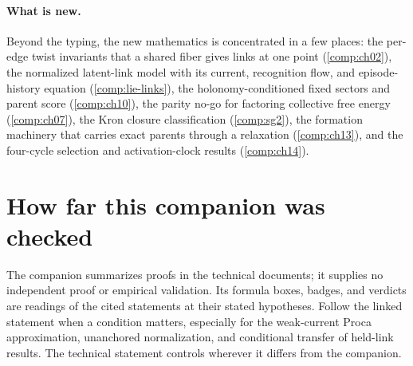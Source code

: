 \paragraph{What is new.}
Beyond the typing, the new mathematics is concentrated in a few places: the per-edge twist invariants
that a shared fiber gives links at one point (\cref{comp:ch02}), the normalized latent-link model
with its current, recognition flow, and episode-history equation (\cref{comp:lie-links}), the holonomy-conditioned fixed
sectors and parent score (\cref{comp:ch10}), the parity no-go for factoring collective free energy
(\cref{comp:ch07}), the Kron closure classification (\cref{comp:sg2}), the formation machinery that
carries exact parents through a relaxation (\cref{comp:ch13}), and the four-cycle selection and
activation-clock results (\cref{comp:ch14}).

\section*{How far this companion was checked}

The companion summarizes proofs in the technical documents; it supplies no independent proof or
empirical validation. Its formula boxes, badges, and verdicts are readings of the cited statements
at their stated hypotheses. Follow the linked statement when a condition matters, especially for
the weak-current Proca approximation, unanchored normalization, and conditional transfer of
held-link results. The technical statement controls wherever it differs from the companion.
